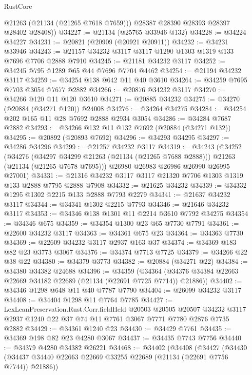 \begin{lexlean}{RustCore}
\begin{coremodule}
          @21263
          (@21134 (@21265 @7618 @7659)))
        @28387
        @28390
        @28393
        @28397
        @28402
        @28408))
@34227 := @21134 (@25765 @33946 @132)
@34228 := @34224 @34227
@34231 := @20821 (@20909 (@20921 @20911))
@34232 := @34231 @33946
@34243 := @21157 @34232 @3117 @3117 @1290 @1303 @1319 @133 @7696 @7706 @2888 @7910
@34245 := @21181 @34232 @3117
@34252 := @34245 @795 @1289 @65 @44 @7696 @7704 @4462
@34254 := @21194 @34232 @3117
@34259 := @34254 @138 @642 @11 @40 @3610
@34264 := @34259 @7695 @7703 @3054 @7677 @2882
@34266 := @20876 @34232 @3117
@34270 := @34266 @120 @11 @120 @3610
@34271 := @20885 @34232
@34275 := @34270 (@20884 (@34271 @120)) @24008
@34276 := @34264 @34275
@34284 := @34254 @202 @165 @11 @28 @7692 @2888 @2934 @3054
@34286 := @34284 @7687 @2882
@34293 := @34266 @132 @11 @132 @7692 (@20884 (@34271 @132))
@34295 := @20892 (@20893 @7692)
@34296 := @34293 @34295
@34297 := @34286 @34296
@34299 := @21257 @34232 @3117
@34319 := @34243
    (@34252
      (@34276
        (@34297 @34299 @21263 (@21134 (@21265 @7688 @2888)))
        @21263
        (@21134 (@21265 @7678 @7695)))
      @26980
      @26983
      @26986
      @26990
      @26995
      @27001)
@34331 := @21316 @34232 @3117 @3117 @21320 @7706 @1303 @1319 @133 @2888 @7795 @2888 @7908
@34332 := @21625 @34232
@34339 := @34332 @1295 @1302 @2215 @133 @2888 @7793 @2279
@34341 := @21637 @34232 @3117
@34344 := @34341 @1302 @2215 @7793
@34346 := @21646 @34232 @3117
@34353 := @34346 @138 @1301 @11 @2214 @3610 @7792 @34275
@34354 := @34346 @675
@34359 := @34354 @1300 @23 @65 @7730 @7791
@34361 := @22600 @34232 @3117
@34363 := @34361 @675 @23
@34364 := @34363 @7730
@34369 := @22609 @34232 @3117 @2937 @163 @37
@34374 := @34369 @183 @82 @23 @3773 @3067
@34376 := @34374 @7713 @7725
@34379 := @34266 @22 @38 @22
@34380 := @34379 @3773
@34382 := @20884 (@34271 @22)
@34384 := @34380 @34382 @24688
@34396 := @34359
    (@34364 (@34376 @34384 @22663 @22669 @34182 @22689 (@21134 (@22691 @7725 @7714)) @21886))
@34402 := @34346 @1298 @648 @11 @40 @7787 @7790
@34404 := @26099 @34232 @3117
@34408 := @34404 @1298 @11 @7764 @7785
@34427 := LexLeanPreservation.Rust.Corr.fieldHeld
    @20503
    @20505
    @20507
    @34232
    @3117
    @2937
    @1240
    @22
    @37
    @74
    @11
    @7761
    @3067
    @7771
    @7780
    @2876
    @7735
    @2882
@34429 := @34361 @1240 @23
@34430 := @34429 @7761
@34435 := @34369 @198 @82 @23 @4280 @3067
@34437 := @34435 @7743 @7756
@34440 := @34379 @4280 @34382 @26221
@34468 := @34402
    (@34408
      (@34427
        (@34430 (@34437 @34440 @22663 @22669 @33255 @22689 (@21134 (@22691 @7756 @7744)) @21886))

\end{coremodule}
\end{lexlean}
